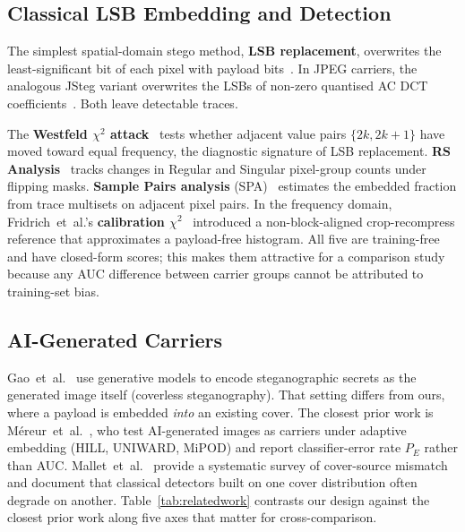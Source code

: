 \documentclass[10pt,twocolumn,a4paper]{article}
\begin{document}
\subsection{Classical LSB Embedding and Detection}
The simplest spatial-domain stego method, \textbf{LSB replacement}, overwrites the least-significant bit of each pixel with payload bits~\cite{petitcolas1999,hussain2018}. In JPEG carriers, the analogous JSteg variant overwrites the LSBs of non-zero quantised AC DCT coefficients~\cite{westfeld1999chi,fridrich2003calib}. Both leave detectable traces.

The \textbf{Westfeld $\chi^2$ attack}~\cite{westfeld1999chi} tests whether adjacent value pairs $\{2k,2k\!+\!1\}$ have moved toward equal frequency, the diagnostic signature of LSB replacement. \textbf{RS Analysis}~\cite{fridrich2001lsb} tracks changes in Regular and Singular pixel-group counts under flipping masks. \textbf{Sample Pairs analysis} (SPA)~\cite{dumitrescu2003sp} estimates the embedded fraction from trace multisets on adjacent pixel pairs. In the frequency domain, Fridrich~et~al.'s \textbf{calibration $\chi^2$}~\cite{fridrich2003calib} introduced a non-block-aligned crop-recompress reference that approximates a payload-free histogram. All five are training-free and have closed-form scores; this makes them attractive for a comparison study because any AUC difference between carrier groups cannot be attributed to training-set bias.

\subsection{AI-Generated Carriers}
Gao~et~al.~\cite{gao2022ai} use generative models to encode steganographic secrets as the generated image itself (coverless steganography). That setting differs from ours, where a payload is embedded \emph{into} an existing cover. The closest prior work is M\'{e}reur~et~al.~\cite{mereur2024deepfake}, who test AI-generated images as carriers under adaptive embedding (HILL, UNIWARD, MiPOD) and report classifier-error rate $P_E$ rather than AUC. Mallet~et~al.~\cite{mallet2024csm} provide a systematic survey of cover-source mismatch and document that classical detectors built on one cover distribution often degrade on another. Table~\ref{tab:relatedwork} contrasts our design against the closest prior work along five axes that matter for cross-comparison.
\end{document}
